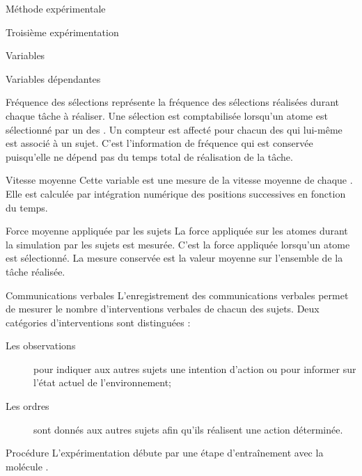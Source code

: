 \documentclass[myfrancais,ngerman,english,frenchb]{mythesis}
\begin{document}
\begin{mychapter}{Méthode expérimentale}
\begin{mysection}{Troisième expérimentation}
\begin{mysubsection}{Variables}
\begin{mysubsubsection}{Variables dépendantes}
					\begin{myparagraph}{ Fréquence des sélections}
						 représente la fréquence des sélections réalisées durant chaque tâche à réaliser.
						Une sélection est comptabilisée lorsqu'un atome est sélectionné par un des .
						Un compteur est affecté pour chacun des  qui lui-même est associé à un sujet.
						C'est l'information de fréquence qui est conservée puisqu'elle ne dépend pas du temps total de réalisation de la tâche.
					\end{myparagraph}
					\begin{myparagraph}{ Vitesse moyenne}
						Cette variable est une mesure de la vitesse moyenne de chaque .
						Elle est calculée par intégration numérique des positions successives en fonction du temps.
					\end{myparagraph}
					\begin{myparagraph}{ Force moyenne appliquée par les sujets}
						La force appliquée sur les atomes durant la simulation par les sujets est mesurée.
						C'est la force appliquée lorsqu'un atome est sélectionné.
						La mesure conservée est la valeur moyenne sur l'ensemble de la tâche réalisée.
					\end{myparagraph}
					\begin{myparagraph}{ Communications verbales}
						L'enregistrement des communications verbales permet de mesurer le nombre d'interventions verbales de chacun des sujets.
						Deux catégories d'interventions sont distinguées :
						\begin{description}
							\item[Les observations] pour indiquer aux autres sujets une intention d'action ou pour informer sur l'état actuel de l'environnement;
							\item[Les ordres] sont donnés aux autres sujets afin qu'ils réalisent une action déterminée.
						\end{description}
					\end{myparagraph}
				\end{mysubsubsection}
			\end{mysubsection}
			\begin{mysubsection}{Procédure}
				L'expérimentation débute par une étape d'entraînement avec la molécule \myTRPCAGE.

\end{mysubsection}
\end{mysection}
\end{mychapter}
\end{document}
